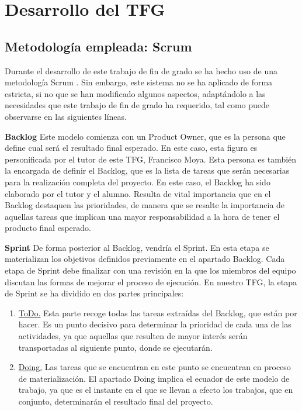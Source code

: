 \chapter{Desarrollo del TFG}
\label{ch:desarrollo}

\section{Metodología empleada: Scrum} 
\label{sec:metodologia-empleada}

Durante el desarrollo de este trabajo de fin de grado se ha hecho uso de una metodología Scrum \cite{andrewlittlefield2018}. Sin embargo, este sistema no se ha aplicado de forma estricta, si no que se han modificado algunos aspectos, adaptándolo a las necesidades que este trabajo de fin de grado ha requerido, tal como puede observarse en las siguientes líneas. 

\textbf{\large Backlog}
Este modelo comienza con un Product Owner, que es la persona que define cual será el resultado final esperado. En este caso, esta figura es personificada por el tutor de este TFG, Francisco Moya. Esta persona es también la encargada de definir el Backlog, que es la lista de tareas que serán necesarias para la realización completa del proyecto. En este caso, el Backlog ha sido elaborado por el tutor y el alumno.
Resulta de vital importancia que en el Backlog destaquen las prioridades, de manera que se resalte la importancia de aquellas tareas que implican una mayor responsabilidad a la hora de tener el producto final esperado.

\textbf{\large Sprint}
De forma posterior al Backlog, vendría el Sprint. En esta etapa se materializan los objetivos definidos previamente en el apartado Backlog. Cada etapa de Sprint debe finalizar con una revisión en la que los miembros del equipo discutan las formas de mejorar el proceso de ejecución. En nuestro TFG, la etapa de Sprint se ha dividido en dos partes principales:
\begin{enumerate}
\item \underline{ToDo.} Esta parte recoge todas las tareas extraídas del Backlog, que están por hacer. Es un punto decisivo para determinar la prioridad de cada una de las actividades, ya que aquellas que resulten de mayor interés serán transportadas al siguiente punto, donde se ejecutarán.
\item \underline{Doing.} Las tareas que se encuentran en este punto se encuentran en proceso de materialización. El apartado Doing implica el ecuador de este modelo de trabajo, ya que es el instante en el que se llevan a efecto los trabajos, que en conjunto, determinarán el resultado final del proyecto.
\end{enumerate}

